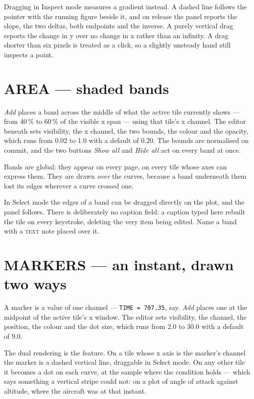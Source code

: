 \documentclass[11pt,a4paper,oneside]{report}
\newcommand{\code}[1]{\texttt{#1}}
\newcommand{\tab}[1]{\textsc{#1}}
\begin{document}
Dragging in Inspect mode measures a gradient instead. A dashed line follows the
pointer with the running figure beside it, and on release the panel reports the
slope, the two deltas, both endpoints and the inverse. A purely vertical drag
reports the change in y over no change in x rather than an infinity. A drag
shorter than six pixels is treated as a click, so a slightly unsteady hand still
inspects a point.

\section{AREA --- shaded bands}

\emph{Add} places a band across the middle of what the active tile currently
shows --- from 40\,\% to 60\,\% of the visible x span --- using that tile's x
channel. The editor beneath sets visibility, the x channel, the two bounds, the
colour and the opacity, which runs from 0.02 to 1.0 with a default of 0.20. The
bounds are normalised on commit, and the two buttons \emph{Show all} and
\emph{Hide all} act on every band at once.

Bands are global: they appear on every page, on every tile whose axes can express
them. They are drawn \emph{over} the curves, because a band underneath them lost
its edges wherever a curve crossed one.

In Select mode the edges of a band can be dragged directly on the plot, and the
panel follows. There is deliberately no caption field: a caption typed here
rebuilt the tile on every keystroke, deleting the very item being edited. Name a
band with a \tab{text} note placed over it.

\section{MARKERS --- an instant, drawn two ways}

A marker is a value of one channel --- \code{TIME = 707.35}, say. \emph{Add}
places one at the midpoint of the active tile's x window. The editor sets
visibility, the channel, the position, the colour and the dot size, which runs
from 2.0 to 30.0 with a default of 9.0.

The dual rendering is the feature. On a tile whose x axis is the marker's channel
the marker is a dashed vertical line, draggable in Select mode. On any other tile
it becomes a dot on each curve, at the sample where the condition holds --- which
says something a vertical stripe could not: on a plot of angle of attack against
altitude, where the aircraft was at that instant.
\end{document}
